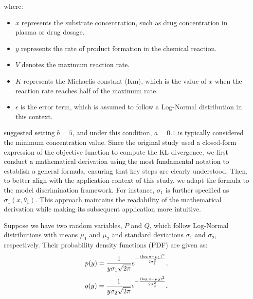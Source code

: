 where: 
\begin{itemize}
\item $x$ represents the substrate concentration, such as drug concentration in plasma or drug dosage.

\item $y$ represents the rate of product formation in the chemical reaction.

\item $V$ denotes the maximum reaction rate.

\item $K$ represents the Michaelis constant (Km), which is the value of $x$ when the reaction rate reaches half of the maximum rate.

\item $\epsilon$ is the error term, which is assumed to follow a Log-Normal distribution in this context.

\end{itemize}

\hspace*{8mm} \cite{lopez2002design} suggested setting $b=5$, and under this condition, $a=0.1$ is typically considered the minimum concentration value. Since the original study used a closed-form expression of the objective function to compute the KL divergence, we first conduct a mathematical derivation using the most fundamental notation to establish a general formula, ensuring that key steps are clearly understood. Then, to better align with the application context of this study, we adapt the formula to the model discrimination framework. For instance, $\sigma_1$ is further specified as $\sigma_1(x,\theta_1)$. This approach maintains the readability of the mathematical derivation while making its subsequent application more intuitive.

\hspace*{8mm} Suppose we have two random variables, $P$ and $Q$, which follow Log-Normal distributions with means $\mu_1$ and $\mu_2$ and standard deviations $\sigma_1$ and $\sigma_2$, respectively. Their probability density functions (PDF) are given as:
\begin{equation} \notag
p(y) = \frac{1}{y \sigma_1 \sqrt{2\pi}} e^{-\frac{(\log y - \mu_1)^2}{2\sigma_1^2}},
\end{equation}
\begin{equation} \notag
q(y) = \frac{1}{y \sigma_2 \sqrt{2\pi}} e^{-\frac{(\log y - \mu_2)^2}{2\sigma_2^2}}.
\end{equation}

